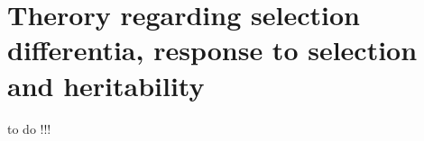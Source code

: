 \section{Therory regarding selection differentia, response to selection and heritability}
\label{text_SandR}


to do !!!

